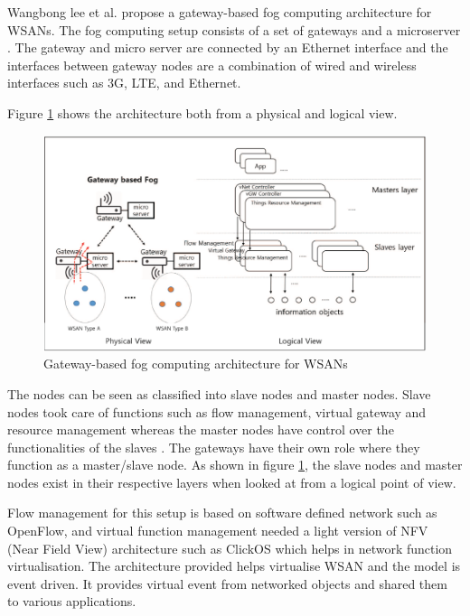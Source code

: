 \documentclass{article}
\begin{document}
Wangbong lee et al. \cite{lee2016gateway} propose a gateway-based fog computing architecture for WSANs. The fog computing setup consists of a set of gateways and a microserver \cite{lee2016gateway}.
The gateway and micro server are connected by an Ethernet interface and the interfaces between gateway nodes are a combination of wired and wireless interfaces such as 3G, LTE, and Ethernet\cite{lee2016gateway}.

Figure \ref{fig:gateway} shows the architecture both from a physical and logical view.

\begin{figure}[H]
	\centering
	\includegraphics[scale=0.5]{gateway.png}
	\caption{Gateway-based fog computing architecture for WSANs \cite{lee2016gateway}}
	\label{fig:gateway}
\end{figure} 

The nodes can be seen as classified into slave nodes and master nodes. Slave nodes took care of functions such as flow management, virtual gateway and resource management whereas the master nodes have control over the functionalities of the slaves \cite{lee2016gateway}. The gateways have their own role where they function as a master/slave node. As shown in figure \ref{fig:gateway}, the slave nodes and master nodes exist in their respective layers when looked at from a logical point of view. 

Flow management for this setup is based on software defined network such as OpenFlow, and virtual function management needed a light version of NFV (Near Field View) architecture such as ClickOS \cite{martins2014clickos} which helps in network function virtualisation.
The architecture provided helps virtualise WSAN and the model is event driven. It provides virtual event from networked objects and shared them to various applications.
\end{document}
